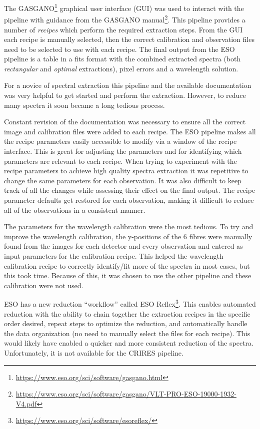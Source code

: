 The GASGANO\footnote{\href{https://www.eso.org/sci/software/gasgano.html}{https://www.eso.org/sci/software/gasgano.html}} graphical user interface (GUI) was used to interact with the pipeline with guidance from the GASGANO manual\footnote{\href{https://www.eso.org/sci/software/gasgano/VLT-PRO-{ESO}-19000-1932-V4.pdf}{https://www.eso.org/sci/software/gasgano/VLT-PRO-{ESO}-19000-1932-V4.pdf}}.
This pipeline provides a number of \emph{recipes} which perform the required extraction steps.
From the GUI each recipe is manually selected, then the correct calibration and observation files need to be selected to use with each recipe.
The final output from the {ESO} pipeline is a table in a fits format with the combined extracted spectra (both \emph{rectangular} and \emph{optimal} extractions), pixel errors and a wavelength solution.

For a novice of spectral extraction this pipeline and the available documentation was very helpful to get started and perform the extraction.
However, to reduce many spectra it soon became a long tedious process.

Constant revision of the documentation was necessary to ensure all the correct image and calibration files were added to each recipe.
The {ESO} pipeline makes all the recipe parameters easily accessible to modify via a window of the recipe interface.
This is great for adjusting the parameters and for identifying which parameters are relevant to each recipe.
When trying to experiment with the recipe parameters to achieve high quality spectra extraction it was repetitive to change the same parameters for each observation.
It was also difficult to keep track of all the changes while assessing their effect on the final output.
The recipe parameter defaults get restored for each observation, making it difficult to reduce all of the observations in a consistent manner.

The parameters for the wavelength calibration were the most tedious.
To try and improve the wavelength calibration, the {y-positions} of the 6 \thar{} fibres were manually found from the images for each detector and every observation and entered as input parameters for the calibration recipe.
This helped the wavelength calibration recipe to correctly identify/fit more of the \thar{} spectra in most cases, but this took time.
Because of this, it was chosen to use the other pipeline and these calibration were not used.

{ESO} has a new reduction ``workflow'' called {ESO} Reflex\citep{freudling_automated_2013}\footnote{\href{https://www.eso.org/sci/software/esoreflex/}{https://www.eso.org/sci/software/esoreflex/}}.
This enables automated reduction with the ability to chain together the extraction recipes in the specific order desired, repeat steps to optimize the reduction, and automatically handle the data organization (no need to manually select the files for each recipe).
This would likely have enabled a quicker and more consistent reduction of the spectra.
Unfortunately, it is not available for the {CRIRES} pipeline.

